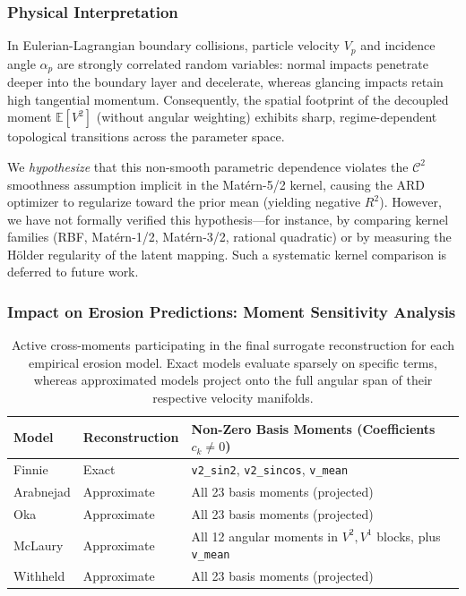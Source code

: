 \documentclass{article}
\begin{document}
\subsubsection{Physical Interpretation}
In Eulerian-Lagrangian boundary collisions, particle velocity $V_p$ and incidence angle $\alpha_p$ are strongly correlated random variables: normal impacts penetrate deeper into the boundary layer and decelerate, whereas glancing impacts retain high tangential momentum. Consequently, the spatial footprint of the decoupled moment $\mathbb{E}[V^2]$ (without angular weighting) exhibits sharp, regime-dependent topological transitions across the parameter space.

We \textit{hypothesize} that this non-smooth parametric dependence violates the $\mathcal{C}^2$ smoothness assumption implicit in the Mat\'ern-5/2 kernel, causing the ARD optimizer to regularize toward the prior mean (yielding negative $R^2$). However, we have not formally verified this hypothesis---for instance, by comparing kernel families (RBF, Mat\'ern-1/2, Mat\'ern-3/2, rational quadratic) or by measuring the H\"older regularity of the latent mapping. Such a systematic kernel comparison is deferred to future work.

\subsubsection{Impact on Erosion Predictions: Moment Sensitivity Analysis}

\begin{table}[htpb]
\centering
\caption{Active cross-moments participating in the final surrogate reconstruction for each empirical erosion model. Exact models evaluate sparsely on specific terms, whereas approximated models project onto the full angular span of their respective velocity manifolds.}
\label{tab:moment_contributions}
\small
\begin{tabular}{llp{8cm}}
\toprule
\textbf{Model} & \textbf{Reconstruction} & \textbf{Non-Zero Basis Moments (Coefficients $c_k \neq 0$)} \\
\midrule
Finnie & Exact & \texttt{v2\_sin2}, \texttt{v2\_sincos}, \texttt{v\_mean} \\
Arabnejad & Approximate & All 23 basis moments (projected) \\
Oka & Approximate & All 23 basis moments (projected) \\
McLaury & Approximate & All 12 angular moments in $V^2, V^1$ blocks, plus \texttt{v\_mean} \\
Withheld & Approximate & All 23 basis moments (projected) \\
\bottomrule
\end{tabular}
\end{table}
\end{document}

